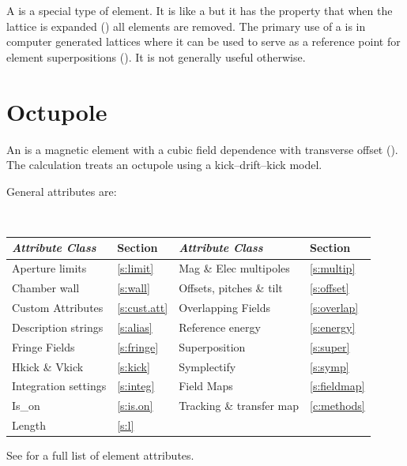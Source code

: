 {A  is a special type of element. It is like a 
but it has the property that when the lattice is expanded
() all  elements are removed. The
primary use of a  is in computer generated lattices where
it can be used to serve as a reference point for element
superpositions (). It is not generally useful otherwise.

\section{Octupole}
\label{s:oct}

An  is a magnetic element with a cubic field dependence
with transverse offset ().  The 
calculation treats an octupole using a kick--drift--kick model.

General  attributes are:
\begin{center}
\tt
\begin{tabular}{llll} \toprule
  {\sl Attribute Class}      & Section             & {\sl Attribute Class}      & Section            \\ \midrule
  Aperture limits            & \ref{s:limit}       & Mag \& Elec multipoles     & \ref{s:multip}     \\
  Chamber wall               & \ref{s:wall}        & Offsets, pitches \& tilt   & \ref{s:offset}     \\
  Custom Attributes          & \ref{s:cust.att}    & Overlapping Fields         & \ref{s:overlap}    \\
  Description strings        & \ref{s:alias}       & Reference energy           & \ref{s:energy}     \\ 
  Fringe Fields              & \ref{s:fringe}      & Superposition              & \ref{s:super}      \\
  Hkick \& Vkick             & \ref{s:kick}        & Symplectify                & \ref{s:symp}       \\
  Integration settings       & \ref{s:integ}       & Field Maps                 & \ref{s:fieldmap}   \\
  Is_on                      & \ref{s:is.on}       & Tracking \& transfer map   & \ref{c:methods}    \\ 
  Length                     & \ref{s:l}           &                            &                    \\
  \bottomrule
\end{tabular}
\end{center}
\toffset
See  for a full list of element attributes.

}
